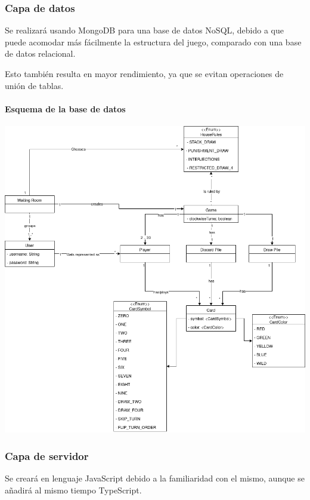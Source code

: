 \subsubsection{Capa de datos}
Se realizará usando MongoDB para una base de datos NoSQL,
debido a que puede acomodar más fácilmente la estructura del juego,
comparado con una base de datos relacional.

Esto también resulta en mayor rendimiento, ya que se evitan operaciones de unión de tablas.

\paragraph{Esquema de la base de datos}

\begin{center}
  \includegraphics[width=1\textwidth]{img/BD_drawio.png}
   \label{fig:dbschema}
\end{center}

\subsubsection{Capa de servidor}
Se creará en lenguaje JavaScript debido a la familiaridad con el mismo, aunque se añadirá al mismo tiempo TypeScript. 


